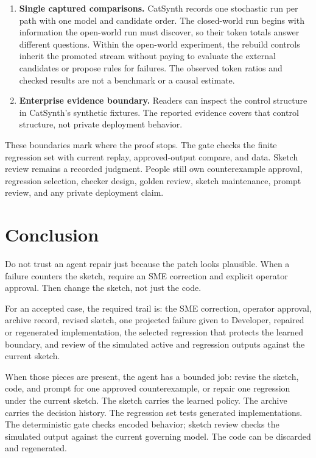 \documentclass[11pt]{article}
\begin{document}
\begin{enumerate}
        its cost.
  \item \textbf{Single captured comparisons.}  CatSynth records one stochastic run per path with
        one model and candidate order.  The closed-world run begins with information the
        open-world run must discover, so their token totals answer different questions.  Within
        the open-world experiment, the rebuild controls inherit the promoted stream without
        paying to evaluate the external candidates or propose rules for failures.  The observed
        token ratios and checked results are not a
        benchmark or a causal estimate.
  \item \textbf{Enterprise evidence boundary.}  Readers can inspect the control
        structure in CatSynth's synthetic fixtures.  The reported evidence covers that control
        structure, not private deployment behavior.
\end{enumerate}

These boundaries mark where the proof stops.  The gate checks the finite regression set with
current replay, approved-output compare, and data.  Sketch review remains a recorded judgment.
People still own counterexample approval, regression selection, checker design, golden review,
sketch maintenance, prompt review, and any private deployment claim.

\section{Conclusion}
\label{sec:conclusion}

Do not trust an agent repair just because the patch looks plausible.  When a failure counters
the sketch, require an SME correction and explicit operator approval.  Then change the sketch,
not just the code.

For an accepted case, the required trail is: the SME correction, operator approval, archive
record, revised sketch, one projected failure given to Developer, repaired or regenerated
implementation, the selected regression that protects the learned boundary, and review of the
simulated active and regression outputs against the current sketch.

When those pieces are present, the agent has a bounded job: revise the sketch, code, and prompt
for one approved counterexample, or repair one regression under the current sketch.  The sketch
carries the learned policy.  The archive carries the decision history.  The regression set tests
generated implementations.  The deterministic gate checks encoded behavior; sketch review
checks the simulated output against the current governing model.  The code can be discarded and
regenerated.
\end{document}
